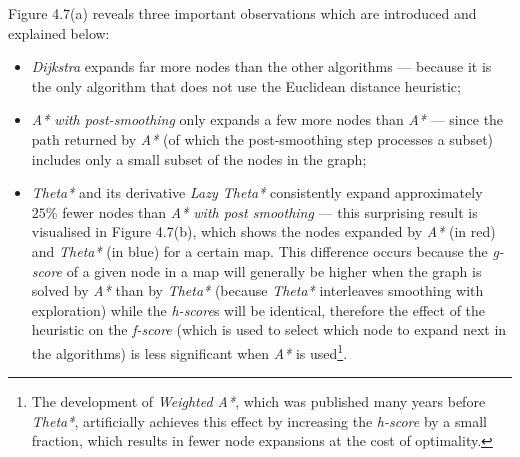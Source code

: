 \documentclass[12pt,notitlepage]{report}
\begin{document}
\noindent
Figure 4.7(a) reveals three important observations which are introduced and explained below:
\begin{itemize}
\item {\em Dijkstra} expands far more nodes than the other algorithms --- because it is the only algorithm that does not use the Euclidean distance heuristic;
\item {\em A* with post-smoothing} only expands a few more nodes than {\em A*} --- since the path returned by {\em A*} (of which the post-smoothing step processes a subset) includes only a small subset of the nodes in the graph;
\item {\em Theta*} and its derivative {\em Lazy Theta*} consistently expand approximately $25\%$ fewer nodes than {\em A* with post smoothing} --- this surprising result is visualised in Figure 4.7(b), which shows the nodes expanded by {\em A*} (in red) and {\em Theta*} (in blue) for a certain map. This difference occurs because the {\em g-score} of a given node in a map will generally be higher when the graph is solved by {\em A*} than by {\em Theta*} (because {\em Theta*} interleaves smoothing with exploration) while the {\em h-score}s will be identical, therefore the effect of the heuristic on the {\em f-score} (which is used to select which node to expand next in the algorithms) is less significant when {\em A*} is used\footnote{The development of {\em Weighted A*}\cite{Pearl84}, which was published many years before {\em Theta*}, artificially achieves this effect by increasing the {\em h-score} by a small fraction, which results in fewer node expansions at the cost of optimality.}.
\end{itemize}
\end{document}
